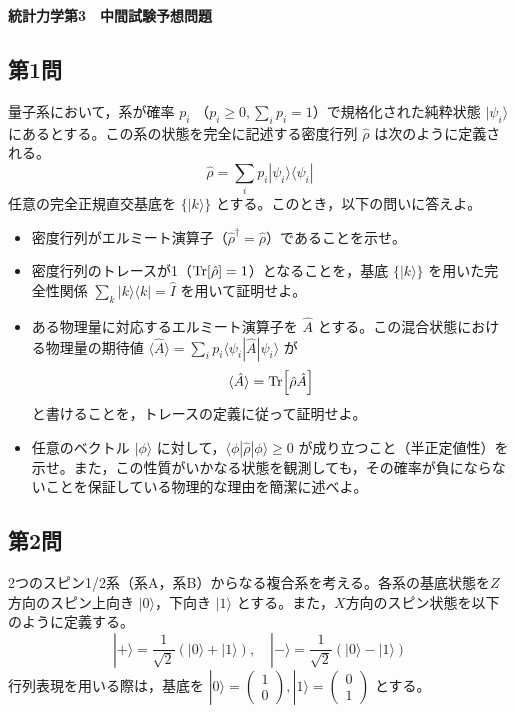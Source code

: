 \documentclass[dvipdfmx,b5paper,twoside]{jsarticle}
\begin{document}
\begin{center}
  {\large \textbf{統計力学第3　中間試験予想問題}}
\end{center}


\subsection*{第1問}
  量子系において，系が確率 $p_i$ （$p_i \ge 0, \sum_i p_i = 1$）で規格化された純粋状態 $|\psi_i\rangle$ にあるとする。この系の状態を完全に記述する密度行列 $\hat{\rho}$ は次のように定義される。
\begin{equation}
  \hat{\rho} = \sum_i p_i |\psi_i\rangle\langle\psi_i|
\end{equation}
任意の完全正規直交基底を $\{|k\rangle\}$ とする。このとき，以下の問いに答えよ。

\begin{itemize}
  \item[(1)] 密度行列がエルミート演算子（$\hat{\rho}^\dagger = \hat{\rho}$）であることを示せ。
  \item[(2)] 密度行列のトレースが1（$\Tr[\hat{\rho}] = 1$）となることを，基底 $\{|k\rangle\}$ を用いた完全性関係 $\sum_k |k\rangle\langle k| = \hat{I}$ を用いて証明せよ。
  \item[(3)] ある物理量に対応するエルミート演算子を $\hat{A}$ とする。この混合状態における物理量の期待値 $\langle \hat{A} \rangle = \sum_i p_i \langle \psi_i | \hat{A} | \psi_i \rangle$ が
  \begin{equation}
    \langle \hat{A} \rangle = \Tr[\hat{\rho} \hat{A}]
  \end{equation}
  と書けることを，トレースの定義に従って証明せよ。
  \item[(4)] 任意のベクトル $|\phi\rangle$ に対して，$\langle \phi | \hat{\rho} | \phi \rangle \ge 0$ が成り立つこと（半正定値性）を示せ。また，この性質がいかなる状態を観測しても，その確率が負にならないことを保証している物理的な理由を簡潔に述べよ。
\end{itemize}






\subsection*{第2問}
2つのスピン1/2系（系A，系B）からなる複合系を考える。各系の基底状態を$Z$方向のスピン上向き $|0\rangle$，下向き $|1\rangle$ とする。また，$X$方向のスピン状態を以下のように定義する。
\begin{equation}
  |+\rangle = \frac{1}{\sqrt{2}}(|0\rangle + |1\rangle), \quad |-\rangle = \frac{1}{\sqrt{2}}(|0\rangle - |1\rangle)
\end{equation}
  行列表現を用いる際は，基底を $|0\rangle = \begin{pmatrix} 1 \\ 0 \end{pmatrix}, |1\rangle = \begin{pmatrix} 0 \\ 1 \end{pmatrix}$ とする。
\end{document}
